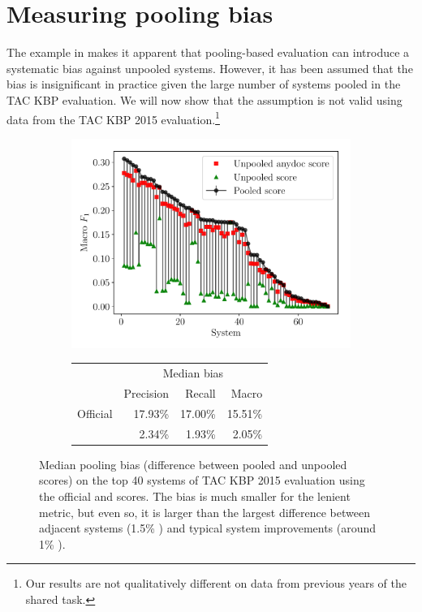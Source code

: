 \section{Measuring pooling bias}
\label{sec:analysis}

The example in  makes it apparent that pooling-based evaluation can introduce a systematic bias against unpooled systems.
However, it has been assumed that the bias is insignificant in practice given the large number of systems pooled in the TAC KBP evaluation.
We will now show that the assumption is not valid using data from the TAC KBP 2015 evaluation.\footnote{%
Our results are not qualitatively different on data from previous years of the shared task.}

\begin{figure}[t]
  \centering
  \begin{subfigure}{\columnwidth}
      \includegraphics[width=\columnwidth]{figures/pooling_bias/pooling_bias}
    \centering
    \small{\begin{tabular} {l r r r} \toprule
                    & \multicolumn{3}{c}{Median bias} \\
                    & Precision & Recall & Macro \fone{} \\ \midrule 
   Official         & 17.93\% &  17.00\% & 15.51\% \\ 
   \anydoc{}        & 2.34\% &  1.93\% & 2.05\% \\ \bottomrule
   \end{tabular}}
  \end{subfigure}
  \caption{\label{fig:pooling-bias} Median pooling bias (difference between pooled and unpooled scores) on the top 40 systems of TAC KBP 2015 evaluation using the official and \anydoc{} scores.
  The bias is much smaller for the lenient \anydoc{} metric, but even so, it is larger than the largest difference between adjacent systems (1.5\% \fone{}) and typical system improvements (around 1\% \fone{}).
  }
\end{figure}
